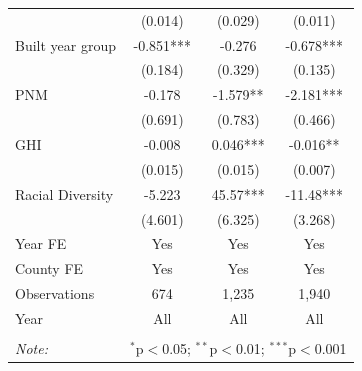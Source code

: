 \documentclass[11pt,twoside,letterpaper]{article}
\begin{document}
\begin{table}[H]
{\begin{tabular}{lccc}
 & (0.014) & (0.029) & (0.011) \\
Built year group & -0.851*** & -0.276 & -0.678*** \\
 & (0.184) & (0.329) & (0.135) \\
PNM & -0.178 & -1.579** & -2.181*** \\
 & (0.691) & (0.783) & (0.466) \\
GHI & -0.008 & 0.046*** & -0.016** \\
 & (0.015) & (0.015) & (0.007) \\
Racial Diversity & -5.223 & 45.57*** & -11.48*** \\
 & (4.601) & (6.325) & (3.268) \\ \cline{1-4}
Year FE & Yes & Yes & Yes \\
County FE & Yes & Yes & Yes \\
Observations & 674 & 1,235 & 1,940 \\
Year & All & All & All \\ 
\hline
\hline \\[-1.8ex]
\textit{Note:} & \multicolumn{3}{r}{$^{*}$p$<$0.05; $^{**}$p$<$0.01; $^{***}$p$<$0.001} \\
\end{tabular}}
\end{table}
\end{document}
